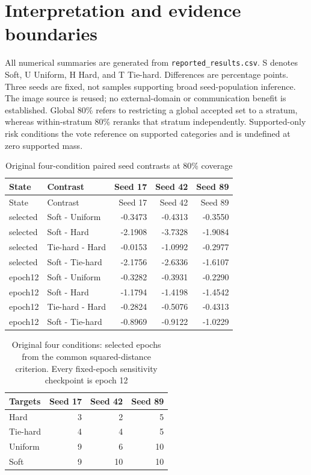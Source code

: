 \documentclass[10pt]{article}
\begin{document}
\section*{Interpretation and evidence boundaries}
All numerical summaries are generated from \texttt{reported\_results.csv}.
S denotes Soft, U Uniform, H Hard, and T Tie-hard. Differences are percentage points.
Three seeds are fixed, not samples supporting broad seed-population inference.
The image source is reused; no external-domain or communication benefit is established.
Global 80\% refers to restricting a global accepted set to a stratum, whereas within-stratum 80\% reranks that stratum independently.
Supported-only risk conditions the vote reference on supported categories and is undefined at zero supported mass.
\begin{longtable}{llrrr}
\caption{Original four-condition paired seed contrasts at 80\% coverage}\label{tab:seeds}\\
\toprule State & Contrast & Seed 17 & Seed 42 & Seed 89\\\midrule\endfirsthead
\toprule State & Contrast & Seed 17 & Seed 42 & Seed 89\\\midrule\endhead
selected & Soft - Uniform & -0.3473 & -0.4313 & -0.3550\\
selected & Soft - Hard & -2.1908 & -3.7328 & -1.9084\\
selected & Tie-hard - Hard & -0.0153 & -1.0992 & -0.2977\\
selected & Soft - Tie-hard & -2.1756 & -2.6336 & -1.6107\\
epoch12 & Soft - Uniform & -0.3282 & -0.3931 & -0.2290\\
epoch12 & Soft - Hard & -1.1794 & -1.4198 & -1.4542\\
epoch12 & Tie-hard - Hard & -0.2824 & -0.5076 & -0.4313\\
epoch12 & Soft - Tie-hard & -0.8969 & -0.9122 & -1.0229\\
\bottomrule\end{longtable}
\begin{table}[ht]
\caption{Original four conditions: selected epochs from the common squared-distance criterion. Every fixed-epoch sensitivity checkpoint is epoch 12}
\centering\begin{tabular}{lrrr}\toprule
Targets & Seed 17 & Seed 42 & Seed 89\\\midrule
Hard & 3 & 2 & 5\\
Tie-hard & 4 & 4 & 5\\
Uniform & 9 & 6 & 10\\
Soft & 9 & 10 & 10\\
\bottomrule\end{tabular}\end{table}
\end{document}
